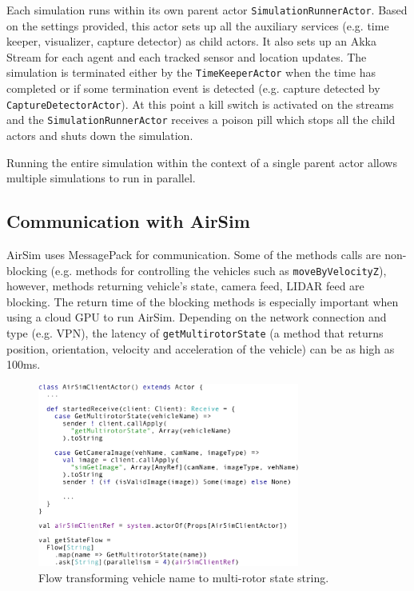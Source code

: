 \documentclass{article}
\begin{document}
Each simulation runs within its own parent actor \verb|SimulationRunnerActor|. Based on the settings provided, this actor sets up all the auxiliary services (e.g. time keeper, visualizer, capture detector) as child actors. It also sets up an Akka Stream for each agent and each tracked sensor and location updates. The simulation is terminated either by the \verb|TimeKeeperActor| when the time has completed or if some termination event is detected (e.g. capture detected by \verb|CaptureDetectorActor|). At this point a kill switch is activated on the streams and the \verb|SimulationRunnerActor| receives a poison pill which stops all the child actors and shuts down the simulation.

Running the entire simulation within the context of a single parent actor allows multiple simulations to run in parallel.

\subsection{Communication with AirSim}

AirSim uses MessagePack \cite{messagepack} for communication. Some of the methods calls are non-blocking (e.g. methods for controlling the vehicles such as \verb|moveByVelocityZ|), however, methods returning vehicle's state, camera feed, LIDAR feed are blocking. The return time of the blocking methods is especially important when using a cloud GPU to run AirSim. Depending on the network connection and type (e.g. VPN), the latency of \verb|getMultirotorState| (a method that returns position, orientation, velocity and acceleration of the vehicle) can be as high as 100ms.


\begin{figure}
	\centering
	\includegraphics[width=8.6cm]{air-sim-client}
	\caption{Flow transforming vehicle name to multi-rotor state string.}\label{fig:air-sim-client}
\end{figure}
\end{document}
